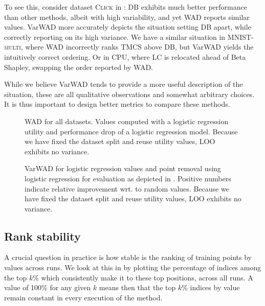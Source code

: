 \documentclass[10pt]{article}
\newcommand{\tmname}[1]{\textsc{#1}}
\begin{document}
To see this, consider dataset {\tmname{Click}} in
: DB exhibits much better
performance than other methods, albeit with high variability, and yet WAD
reports similar values. VarWAD more accurately depicts the situation setting
DB apart, while correctly reporting on its high variance. We have a similar
situation in {\tmname{MNIST-multi}}, where WAD incorrectly ranks TMCS above
DB, but VarWAD yields the intuitively correct ordering. Or in {\tmname{CPU}},
where LC is relocated ahead of Beta Shapley, swapping the order reported by
WAD.

While we believe VarWAD tends to provide a more useful description of the
situation, these are all qualitative observations and somewhat arbitrary
choices. It is thus important to design better metrics to compare these
methods.

\begin{figure}[h]
  \caption{\label{fig:wad-lr-lr}WAD for all datasets. Values computed with a
  logistic regression utility and performance drop of a logistic regression
  model. Because we have fixed the dataset split and reuse utility values, LOO
  exhibits no variance.}
\end{figure}

\begin{figure}[h]
  \caption{\label{fig:varwad-lr-lr}VarWAD for logistic regression values and
  point removal using logistic regression for evaluation as depicted in
  . Positive numbers indicate relative improvement wrt. to
  random values. Because we have fixed the dataset split and reuse utility
  values, LOO exhibits no variance.}
\end{figure}

\subsection{Rank stability}\label{sec:rank-stability}

A crucial question in practice is how stable is the ranking of training points
by values across runs. We look at this in  by
plotting the percentage of indices among the top $k$\% which consistently make
it to these top positions, across all runs. A value of 100\% for any given $k$
means then that the top $k$\% indices by value remain constant in every
execution of the method.
\end{document}
